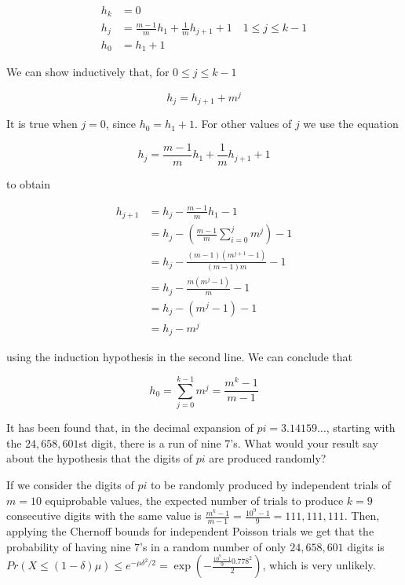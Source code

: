 \documentclass[12pt, a4paper]{article} %
\begin{document}
  \begin{align*}
    h_{k} &= 0 \\
    h_{j} &= \frac{m-1}{m} h_{1} + \frac{1}{m} h_{j+1} + 1 \quad 1 \leq j \leq k - 1 \\
    h_{0} &= h_{1} + 1
  \end{align*}

  We can show inductively that, for $0 \leq j \leq k - 1$

  \begin{equation*}
    h_{j} = h_{j+1} + m^{j}
  \end{equation*}

  It is true when $j = 0$, since $h_{0} = h_{1} + 1$. For other values of $j$ we use the equation

  \begin{equation*}
    h_{j} = \frac{m-1}{m} h_{1} + \frac{1}{m} h_{j+1} + 1
  \end{equation*}

  to obtain

  \begin{align*}
    h_{j+1} &= h_{j} - \frac{m-1}{m} h_{1} - 1 \\
           &= h_{j} - (\frac{m-1}{m}\sum_{i = 0}^{j} m^{j}) - 1\\
           &= h_{j} - \frac{(m-1)(m^{j+1} - 1)}{(m-1)m} - 1\\
           &= h_{j} - \frac{m(m^{j} - 1)}{m} - 1\\
           &= h_{j} - (m^{j} - 1) - 1\\
           &= h_{j} - m^{j}
  \end{align*}

  using the induction hypothesis in the second line. We can conclude that

  \begin{equation*}
    h_{0} = \sum_{j=0}^{k-1} m^{j} = \frac{m^{k}- 1}{m-1}
  \end{equation*}

It has been found that, in the decimal expansion of $pi = 3.14159\ldots$, starting with the $24,658,601$st digit, there is a run of nine $7$'s. What would your result say about the hypothesis that the digits of $pi$ are produced randomly?

If we consider the digits of $pi$ to be randomly produced by independent trials of $m = 10$ equiprobable values, the expected number of trials to produce $k = 9$ consecutive digits with the same value is $\frac{m^{k} - 1}{m - 1} = \frac{10^{9} - 1}{9} = 111,111,111$. Then, applying the Chernoff bounds for independent Poisson trials we get that the probability of having nine $7$'s in a random number of only $24,658,601$ digits is ${Pr(X \leq (1 - \delta)\mu) \leq e^{- \mu \delta^{2}/2}} = \exp (- \frac{\frac{10^{9}- 1}{9} 0.778^{2}}{2})$, which is very unlikely.
\end{document}
